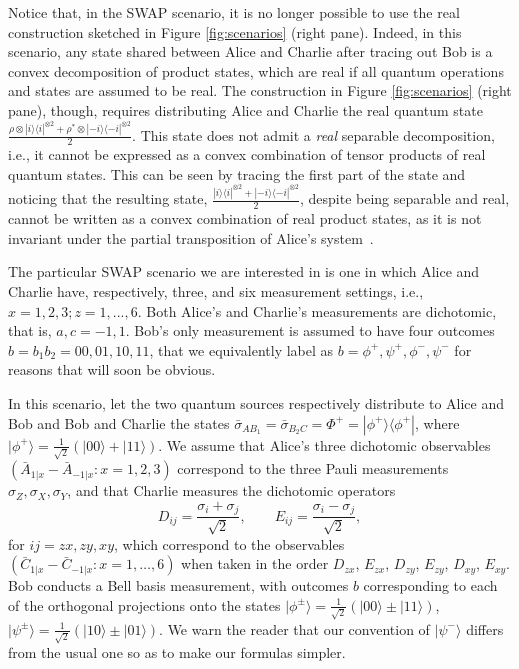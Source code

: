 \documentclass[onecolumn,prx,amsmath,amssymb]{revtex4-2}
\def\be{\begin{equation}}
\def\ee{\end{equation}}
\def\bra#1{\langle#1|} \def\ket#1{|#1\rangle}
\def\proj#1{\ket{#1}\!\bra{#1}}
\begin{document}
\begin{appendix}
Notice that, in the SWAP scenario, it is no longer possible to use the real construction sketched in Figure \ref{fig:scenarios} (right pane). Indeed, in this scenario, any state shared between Alice and Charlie after tracing out Bob is a convex decomposition of product states, which are real if all quantum operations and states are assumed to be real. The construction in Figure \ref{fig:scenarios} (right pane), though, requires distributing Alice and Charlie the real quantum state $\frac{\rho\otimes\proj{i}^{\otimes 2}+\rho^*\otimes\proj{-i}^{\otimes 2}}{2}$. This state does not admit a \emph{real} separable decomposition, i.e., it cannot be expressed as a convex combination of tensor products of real quantum states. This can be seen by tracing the first part of the state and noticing that the resulting state, $\frac{\proj{i}^{\otimes 2}+\proj{-i}^{\otimes 2}}{2}$, despite being separable and real, cannot be written as a convex combination of real product states, as it is not invariant under the partial transposition of Alice's system~\cite{real_entanglement}.


The particular SWAP scenario we are interested in is one in which Alice and Charlie have, respectively, three, and six measurement settings, i.e., $x=1,2,3; z=1,...,6$. Both Alice's and Charlie's measurements are dichotomic, that is, $a,c=-1,1$. Bob's only measurement is assumed to have four outcomes $b=b_1b_2=00,01,10,11$, that we equivalently label as $b=\phi^+,\psi^+,\phi^-,\psi^-$ for reasons that will soon be obvious. 

In this scenario, let the two quantum sources respectively distribute to Alice and Bob and Bob and Charlie the states $\bar{\sigma}_{AB_1}=\bar{\sigma}_{B_2C}=\Phi^+=\proj{\phi^+}$, where $\ket{\phi^+}=\frac{1}{\sqrt{2}}(\ket{00}+\ket{11})$. We assume that Alice's three dichotomic observables $(\bar{A}_{1|x}-\bar{A}_{-1|x}:x=1,2,3)$ correspond to the three Pauli measurements $\sigma_Z,\sigma_X,\sigma_Y$, and that Charlie measures the dichotomic operators
\be
D_{ij}=\frac{\sigma_i+\sigma_j}{\sqrt{2}}, \qquad E_{ij}=\frac{\sigma_i-\sigma_j}{\sqrt{2}},
\ee
\noindent for $ij=zx,zy,xy$, which correspond to the observables $(\bar{C}_{1|x}-\bar{C}_{-1|x}:x=1,\ldots,6)$ when taken in the order $D_{zx}$, $E_{zx}$, $D_{zy}$, $E_{zy}$, $D_{xy}$, $E_{xy}$. Bob conducts a Bell basis measurement, with outcomes $b$ corresponding to each of the orthogonal projections onto the states $\ket{\phi^{\pm}}=\frac{1}{\sqrt{2}}(\ket{00}\pm\ket{11})$, $\ket{\psi^{\pm}}=\frac{1}{\sqrt{2}}(\ket{10}\pm\ket{01})$. We warn the reader that our convention of $\ket{\psi^-}$ differs from the usual one so as to make our formulas simpler. 


\end{appendix}
\end{document}
